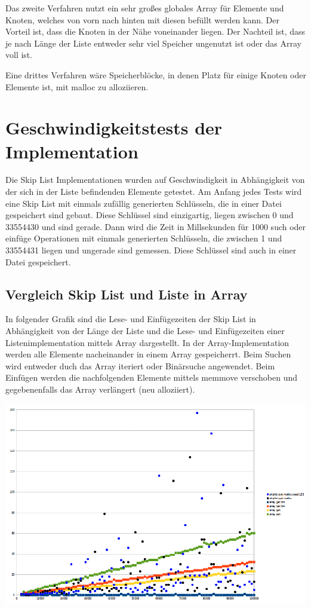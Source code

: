 \documentclass{TUBAFarbeiten}
\begin{document}
Das zweite Verfahren nutzt ein sehr großes globales Array für Elemente und Knoten, welches von vorn nach hinten mit diesen befüllt werden kann. Der Vorteil ist, dass die Knoten in der Nähe voneinander liegen. Der Nachteil ist, dass je nach Länge der Liste entweder sehr viel Speicher ungenutzt ist oder das Array voll ist.

Eine drittes Verfahren wäre Speicherblöcke, in denen Platz für einige Knoten oder Elemente ist, mit malloc zu alloziieren.

\section{Geschwindigkeitstests der Implementation}

Die Skip List Implementationen wurden auf Geschwindigkeit in Abhängigkeit von der sich in der Liste befindenden Elemente getestet. Am Anfang jedes Tests wird eine Skip List mit einmals zufällig generierten Schlüsseln, die in einer Datei gespeichert sind gebaut. Diese Schlüssel sind einzigartig, liegen zwischen 0 und 33554430 und sind gerade.
Dann wird die Zeit in Millsekunden für 1000 such oder einfüge Operationen mit einmals generierten Schlüsseln, die zwischen 1 und 33554431 liegen und ungerade sind gemessen. Diese Schlüssel sind auch in einer Datei gespeichert. 

\subsection {Vergleich Skip List und Liste in Array}

In folgender Grafik sind die Lese- und Einfügezeiten der Skip List in Abhängigkeit von der Länge der Liste und die Lese- und Einfügezeiten einer Listenimplementation mittels Array dargestellt.
In der Array-Implementation werden alle Elemente nacheinander in einem Array gespeicherrt. Beim Suchen wird entweder duch das Array iteriert oder Binärsuche angewendet. Beim Einfügen werden die nachfolgenden Elemente mittels memmove verschoben und gegebenenfalls das Array verlängert (neu alloziiert).

\includegraphics[scale=0.55]{img/diagram_array_skiplist}
\label{fig:Img5}
\end{document}
